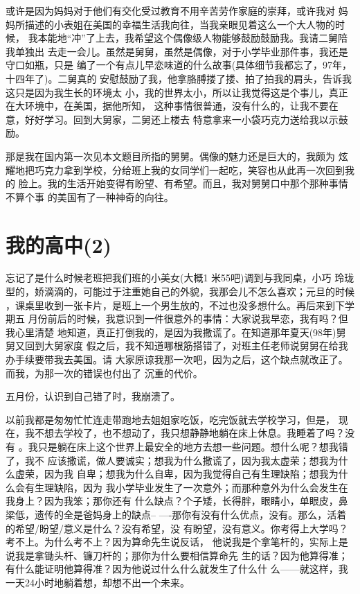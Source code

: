 \documentclass[12pt]{book}
\begin{document}
        或许是因为妈妈对于他们有交化受过教育不用辛苦劳作家庭的崇拜，或许我对
妈妈所描述的小表姐在美国的幸福生活我向往，当我亲眼见着这么一个大人物的时候，
我本能地“冲”了上去，我希望这个偶像级人物能够鼓励鼓励我。我请二舅陪我单独出
去走一会儿。虽然是舅舅，虽然是偶像，对于小学毕业那件事，我还是守口如瓶，只是
编了一个有点儿早恋味道的什么故事(具体细节我都忘了，97年，十四年了)。二舅真的
安慰鼓励了我，他拿胳膊搂了搂、拍了拍我的肩头，告诉我这只是因为我生长的环境太
小，我的世界太小，所以让我觉得这是个事儿，真正在大环境中，在美国，据他所知，
这种事情很普通，没有什么的，让我不要在意，好好学习。回到大舅家，二舅还上楼去
特意拿来一小袋巧克力送给我以示鼓励。

        那是我在国内第一次见本文题目所指的舅舅。偶像的魅力还是巨大的，我颇为
炫耀地把巧克力拿到学校，分给班上我的女同学们一起吃，笑容也从此再一次回到我的
脸上。我的生活开始变得有盼望、有希望。而且，我对舅舅口中那个那种事情不算个事
的美国有了一种神奇的向往。
\section{我的高中(2)}
\label{sec-3-2}

        忘记了是什么时候老班把我们班的小美女(大概1 米55吧)调到与我同桌，小巧
玲珑型的，娇滴滴的，可能过于注重她自己的外貌，我那会儿不怎么喜欢；元旦的时候
，课桌里收到一张卡片，是班上一个男生放的，不过也没多想什么。再后来到下学期五
月份前后的时候，我意识到一件很意外的事情：大家说我早恋，我有吗？但我心里清楚
地知道，真正打倒我的，是因为我撒谎了。在知道那年夏天(98年)舅舅又回到大舅家度
假之后，我不知道哪根筋搭错了，对班主任老师说舅舅在给我办手续要带我去美国。请
大家原谅我那一次吧，因为之后，这个缺点就改正了。而我，为那一次的错误也付出了
沉重的代价。

五月份，认识到自己错了时，我崩溃了。

        以前我都是匆匆忙忙连走带跑地去姐姐家吃饭，吃完饭就去学校学习，但是，
现在，我不想去学校了，也不想动了，我只想静静地躺在床上休息。我睡着了吗？没有
。我只是躺在床上这个世界上最安全的地方去想一些问题。想什么呢？想我错了，我不
应该撒谎，做人要诚实；想我为什么撒谎了，因为我太虚荣；想我为什么虚荣，因为我
自卑；想我为什么自卑，因为我觉得自己有生理缺陷；想我为什么会有生理缺陷，因为
我小学毕业发生了一次意外；而那种意外为什么会发生在我身上？因为我笨；那你还有
什么缺点？个子矮，长得胖，眼睛小，单眼皮，鼻梁低，遗传的全是爸妈身上的缺点--
----那你有没有什么优点，没有。那么，活着的希望/盼望/意义是什么？没有希望，没
有盼望，没有意义。你考得上大学吗？考不上。为什么考不上？因为算命先生说反话，
他说我是个拿笔杆的，实际上是说我是拿锄头杆、镰刀杆的；那你为什么要相信算命先
生的话？因为他算得准；有什么能证明他算得准？因为他说过什么什么就发生了什么什
么------就这样，我一天24小时地躺着想，却想不出一个未来。
\end{document}
